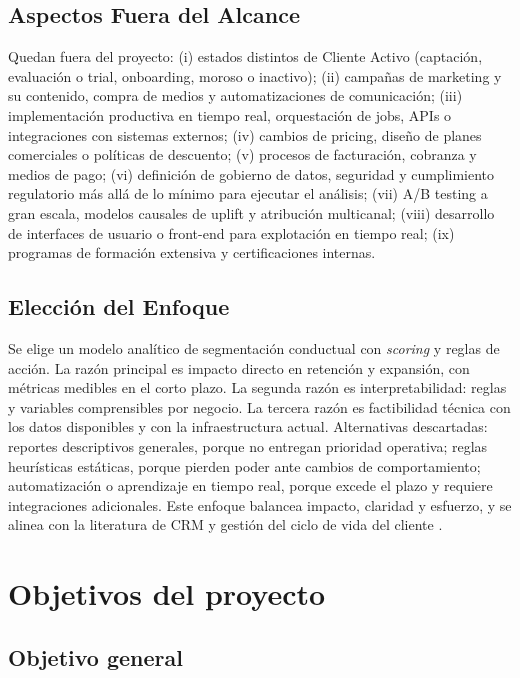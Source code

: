 \subsection{Aspectos Fuera del Alcance}

Quedan fuera del proyecto: (i) estados distintos de Cliente Activo (captación, evaluación o trial, onboarding, moroso o inactivo); (ii) campañas de marketing y su contenido, compra de medios y automatizaciones de comunicación; (iii) implementación productiva en tiempo real, orquestación de jobs, APIs o integraciones con sistemas externos; (iv) cambios de pricing, diseño de planes comerciales o políticas de descuento; (v) procesos de facturación, cobranza y medios de pago; (vi) definición de gobierno de datos, seguridad y cumplimiento regulatorio más allá de lo mínimo para ejecutar el análisis; (vii) A/B testing a gran escala, modelos causales de uplift y atribución multicanal; (viii) desarrollo de interfaces de usuario o front-end para explotación en tiempo real; (ix) programas de formación extensiva y certificaciones internas.

\subsection{Elección del Enfoque}

Se elige un modelo analítico de segmentación conductual con \textit{scoring} y reglas de acción. La razón principal es impacto directo en retención y expansión, con métricas medibles en el corto plazo. La segunda razón es interpretabilidad: reglas y variables comprensibles por negocio. La tercera razón es factibilidad técnica con los datos disponibles y con la infraestructura actual. Alternativas descartadas: reportes descriptivos generales, porque no entregan prioridad operativa; reglas heurísticas estáticas, porque pierden poder ante cambios de comportamiento; automatización o aprendizaje en tiempo real, porque excede el plazo y requiere integraciones adicionales. Este enfoque balancea impacto, claridad y esfuerzo, y se alinea con la literatura de CRM y gestión del ciclo de vida del cliente \citep{Kumar2010}.

\section{Objetivos del proyecto}

\subsection{Objetivo general}

